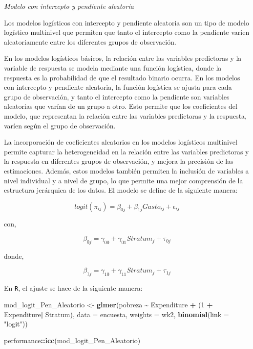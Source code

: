 \documentclass[
  12pt,
]{book}
\newenvironment{Shaded}{\begin{snugshade}}{\end{snugshade}}
\newcommand{\AttributeTok}[1]{\textcolor[rgb]{0.13,0.29,0.53}{#1}}
\newcommand{\DecValTok}[1]{\textcolor[rgb]{0.00,0.00,0.81}{#1}}
\newcommand{\FunctionTok}[1]{\textcolor[rgb]{0.13,0.29,0.53}{\textbf{#1}}}
\newcommand{\NormalTok}[1]{#1}
\newcommand{\OtherTok}[1]{\textcolor[rgb]{0.56,0.35,0.01}{#1}}
\newcommand{\SpecialCharTok}[1]{\textcolor[rgb]{0.81,0.36,0.00}{\textbf{#1}}}
\newcommand{\StringTok}[1]{\textcolor[rgb]{0.31,0.60,0.02}{#1}}
\begin{document}
\emph{Modelo con intercepto y pendiente aleatoria}

Los modelos logísticos con intercepto y pendiente aleatoria son un tipo de modelo logístico multinivel que permiten que tanto el intercepto como la pendiente varíen aleatoriamente entre los diferentes grupos de observación.

En los modelos logísticos básicos, la relación entre las variables predictoras y la variable de respuesta se modela mediante una función logística, donde la respuesta es la probabilidad de que el resultado binario ocurra. En los modelos con intercepto y pendiente aleatoria, la función logística se ajusta para cada grupo de observación, y tanto el intercepto como la pendiente son variables aleatorias que varían de un grupo a otro. Esto permite que los coeficientes del modelo, que representan la relación entre las variables predictoras y la respuesta, varíen según el grupo de observación.

La incorporación de coeficientes aleatorios en los modelos logísticos multinivel permite capturar la heterogeneidad en la relación entre las variables predictoras y la respuesta en diferentes grupos de observación, y mejora la precisión de las estimaciones. Además, estos modelos también permiten la inclusión de variables a nivel individual y a nivel de grupo, lo que permite una mejor comprensión de la estructura jerárquica de los datos. El modelo se define de la siguiente manera:

\[
logit(\pi_{ij})=\beta_{0j}+\beta_{1j}Gasto_{ij}+\epsilon_{ij}
\]

con,

\[
\beta_{0j} = \gamma_{00}+\gamma_{01}Stratum_{j} + \tau_{0j}
\]

donde,

\[
\beta_{1j} = \gamma_{10}+\gamma_{11}Stratum_{j} + \tau_{1j}
\]

En \texttt{R}, el ajuste se hace de la siguiente manera:

\begin{Shaded}
\begin{Highlighting}[]
\NormalTok{mod\_logit\_Pen\_Aleatorio }\OtherTok{\textless{}{-}} \FunctionTok{glmer}\NormalTok{(pobreza }\SpecialCharTok{\textasciitilde{}}\NormalTok{ Expenditure  }\SpecialCharTok{+}\NormalTok{ (}\DecValTok{1} \SpecialCharTok{+}\NormalTok{ Expenditure}\SpecialCharTok{|}\NormalTok{ Stratum),}
  \AttributeTok{data =}\NormalTok{ encuesta, }\AttributeTok{weights  =}\NormalTok{  wk2, }\FunctionTok{binomial}\NormalTok{(}\AttributeTok{link =} \StringTok{"logit"}\NormalTok{))}

\NormalTok{performance}\SpecialCharTok{::}\FunctionTok{icc}\NormalTok{(mod\_logit\_Pen\_Aleatorio)}
\end{Highlighting}
\end{Shaded}
\end{document}
